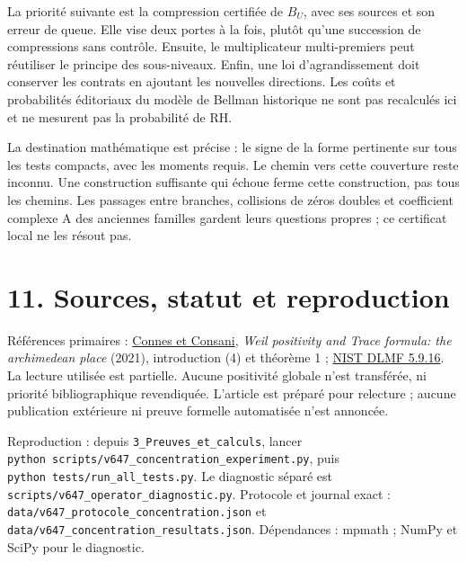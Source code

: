 \documentclass[
  10pt,
  a4paper,
]{article}
\begin{document}
La priorité suivante est la compression certifiée de \(B_U\), avec ses
sources et son erreur de queue. Elle vise deux portes à la fois, plutôt
qu'une succession de compressions sans contrôle. Ensuite, le
multiplicateur multi-premiers peut réutiliser le principe des
sous-niveaux. Enfin, une loi d'agrandissement doit conserver les
contrats en ajoutant les nouvelles directions. Les coûts et probabilités
éditoriaux du modèle de Bellman historique ne sont pas recalculés ici et
ne mesurent pas la probabilité de RH.

La destination mathématique est précise : le signe de la forme
pertinente sur tous les tests compacts, avec les moments requis. Le
chemin vers cette couverture reste inconnu. Une construction suffisante
qui échoue ferme cette construction, pas tous les chemins. Les passages
entre branches, collisions de zéros doubles et coefficient complexe A
des anciennes familles gardent leurs questions propres ; ce certificat
local ne les résout pas.

\hypertarget{sources-statut-et-reproduction}{%
\section{11. Sources, statut et
reproduction}\label{sources-statut-et-reproduction}}

Références primaires :
\href{https://alainconnes.org/wp-content/uploads/Selecta.pdf}{Connes et
Consani}, \emph{Weil positivity and Trace formula: the archimedean
place} (2021), introduction (4) et théorème 1 ;
\href{https://dlmf.nist.gov/5.9\#E16}{NIST DLMF 5.9.16}. La lecture
utilisée est partielle. Aucune positivité globale n'est transférée, ni
priorité bibliographique revendiquée. L'article est préparé pour
relecture ; aucune publication extérieure ni preuve formelle automatisée
n'est annoncée.

Reproduction : depuis \texttt{3\_Preuves\_et\_calculs}, lancer
\texttt{python\ scripts/v647\_concentration\_experiment.py}, puis
\texttt{python\ tests/run\_all\_tests.py}. Le diagnostic séparé est
\texttt{scripts/v647\_operator\_diagnostic.py}. Protocole et journal
exact : \texttt{data/v647\_protocole\_concentration.json} et
\texttt{data/v647\_concentration\_resultats.json}. Dépendances : mpmath
; NumPy et SciPy pour le diagnostic.
\end{document}
